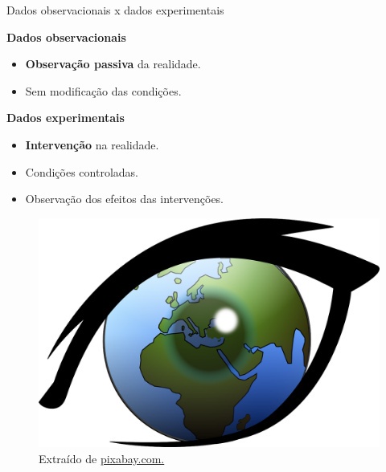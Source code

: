 \documentclass[
  ignorenonframetext,
  serif,
  professionalfont,
  usenames,
  dvipsnames,
  aspectratio = 169]{beamer}
\providecommand{\tightlist}{%
  \setlength{\itemsep}{0pt}\setlength{\parskip}{0pt}}
\renewcommand{\tightlist}{%
  \setlength{\itemsep}{0\baselineskip}
  \setlength{\parskip}{0.25\baselineskip}
}
\def\beginAHalfColumn{\begin{minipage}{0.49\textwidth}}%
\def\endColumns{\end{minipage}}%
\begin{document}
\begin{frame}{Dados observacionais x dados experimentais}
\label{dados-observacionais-x-dados-experimentais}
\beginAHalfColumn

\textbf{Dados observacionais}

\begin{itemize}
\tightlist
\item
  \textbf{Observação passiva} da realidade.
\item
  Sem modificação das condições.
\end{itemize}

\vspace{0.3cm}

\textbf{Dados experimentais}

\begin{itemize}
\tightlist
\item
  \textbf{Intervenção} na realidade.
\item
  Condições controladas.
\item
  Observação dos efeitos das intervenções.
\end{itemize}

\endColumns
\beginAHalfColumn

\begin{figure}

{\centering \includegraphics[width=0.9\linewidth]{./img/observar} 

}

\caption{Extraído de \href{https://cdn.pixabay.com/photo/2013/07/12/15/08/earth-149499_1280.png}{pixabay.com.}}\label{fig:unnamed-chunk-26}
\end{figure}

\endColumns
\end{frame}
\end{document}
